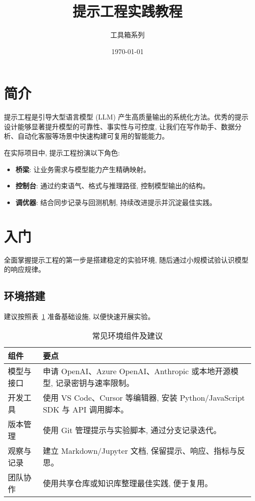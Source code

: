 ﻿\documentclass[12pt]{ctexart}
\title{提示工程实践教程}
\author{工具箱系列}
\date{\today}
\begin{document}
\maketitle

\section{简介}
提示工程是引导大型语言模型 (LLM) 产生高质量输出的系统化方法。优秀的提示设计能够显著提升模型的可靠性、事实性与可控度, 让我们在写作助手、数据分析、自动化客服等场景中快速构建可复用的智能能力。

在实际项目中, 提示工程扮演以下角色:
\begin{itemize}[leftmargin=*,itemsep=0.4em]
  \item \textbf{桥梁}: 让业务需求与模型能力产生精确映射。
  \item \textbf{控制台}: 通过约束语气、格式与推理路径, 控制模型输出的结构。
  \item \textbf{调优器}: 结合同步记录与回测机制, 持续改进提示并沉淀最佳实践。
\end{itemize}

\section{入门}
全面掌握提示工程的第一步是搭建稳定的实验环境, 随后通过小规模试验认识模型的响应规律。

\subsection{环境搭建}
建议按照表~\ref{tab:setup} 准备基础设施, 以便快速开展实验。

\begin{table}[h]
  \centering
  \caption{常见环境组件及建议}
  \label{tab:setup}
  \begin{tabular}{p{4cm}p{9cm}}
    \toprule
    组件 & 要点 \\
    \midrule
    模型与接口 & 申请 OpenAI、Azure OpenAI、Anthropic 或本地开源模型, 记录密钥与速率限制。 \\
    开发工具 & 使用 VS Code、Cursor 等编辑器, 安装 Python/JavaScript SDK 与 API 调用脚本。 \\
    版本管理 & 使用 Git 管理提示与实验脚本, 通过分支记录迭代。 \\
    观察与记录 & 建立 Markdown/Jupyter 文档, 保留提示、响应、指标与反思。 \\
    团队协作 & 使用共享仓库或知识库整理最佳实践, 便于复用。 \\
    \bottomrule
  \end{tabular}
\end{table}
\end{document}

